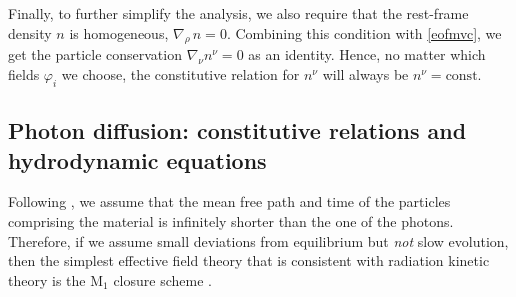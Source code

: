 \documentclass[a4paper, amsfonts, amssymb, amsmath, reprint, twocolumn, showkeys, nofootinbib]{revtex4-2}
\begin{document}
Finally, to further simplify the analysis, we also require that the rest-frame density $n$ is homogeneous, $\nabla_\rho \, n = 0$.
Combining this condition with \eqref{eofmvc}, we get the particle conservation $\nabla_\nu n^\nu=0$ as an identity. Hence, no matter which fields $\varphi_i$ we choose, the constitutive relation for $n^\nu$ will always be $n^\nu = \text{const}$.


\subsection{Photon diffusion: constitutive relations and hydrodynamic equations}
\label{JonasCurioso}
 
Following \citet{Weinberg1971}, we assume that the mean free path and time of the particles comprising the material is infinitely shorter than the one of the photons. Therefore, if we assume small deviations from equilibrium but \textit{not} slow evolution, then the simplest effective field theory that is consistent with radiation kinetic theory \citep{mihalas_book} is the $\text{M}_1$ closure scheme \citep{Sadowski2013}.
\end{document}
